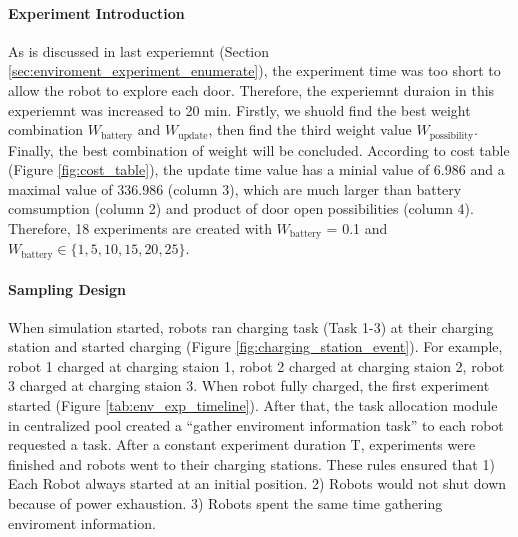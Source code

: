 \paragraph{Experiment Introduction} 
As is discussed in last experiemnt (Section \ref{sec:enviroment_experiment_enumerate}), the experiment time was too short to allow the robot to explore each door. Therefore, the experiemnt duraion in this experiemnt was increased to 20 min.
Firstly, we shuold find the best weight combination $W_{\mbox{battery}}$ and $ W_{\mbox{update}}$, then find the third weight value $W_{\mbox{possibility}}$. Finally, the best combination of weight will be concluded.
 According to cost table (Figure \ref{fig:cost_table}), the update time value has a minial value of 6.986 and a maximal value of 336.986 (column 3), which are much larger than battery comsumption (column 2) and product of door open possibilities (column 4).
  Therefore, 18 experiments are created with $W_{\mbox{battery}}$
   = 0.1  and $W_{\mbox{battery}} \in \{1,5,10,15,20,25 \}$.

\paragraph{Sampling Design} When simulation started, robots ran charging task (Task 1-3) at their charging station and started charging (Figure \ref{fig:charging_station_event}). For example, robot 1 charged at charging staion 1, robot 2 charged at charging staion 2, robot 3 charged at charging staion 3. When robot fully charged, the first experiment started (Figure \ref{tab:env_exp_timeline}). After that, the task allocation module in centralized pool created a ``gather enviroment information task'' to each robot requested a task. After a constant experiment duration T, experiments were finished and robots went to their charging stations. These rules ensured that 1) Each Robot always started at an initial position. 2) Robots would not shut down because of power exhaustion. 3) Robots spent the same time gathering enviroment information.

